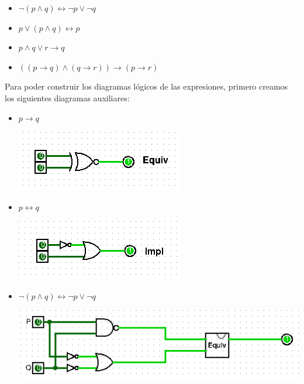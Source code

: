 \documentclass[answers]{exam}
\begin{document}
\begin{questions}
  \begin{itemize}
    \item $\neg(p \land q) \leftrightarrow \neg p \lor \neg q$
    \item $p \lor (p \land q) \leftrightarrow p$
    \item $p \land q \lor r \to q$
    \item $((p \to q) \land (q \to r)) \to (p \to r)$
  \end{itemize}
  \begin{solution}
    Para poder construir los diagramas lógicos de las expresiones, primero
    creamos los siguientes diagramas auxiliares:
    \begin{itemize}
      \item $p \to q$
            \begin{center}
              \includegraphics[scale=0.9]{equiv}
            \end{center}
      \item $p \leftrightarrow q$
            \begin{center}
              \includegraphics[scale=0.9]{impl}
            \end{center}
    \end{itemize}
    \begin{itemize}
      \item $\neg(p \land q) \leftrightarrow \neg p \lor \neg q$
            \begin{center}
              \includegraphics[scale=0.9]{ejercicio1.1}

\end{center}
\end{itemize}
\end{solution}
\end{questions}
\end{document}
